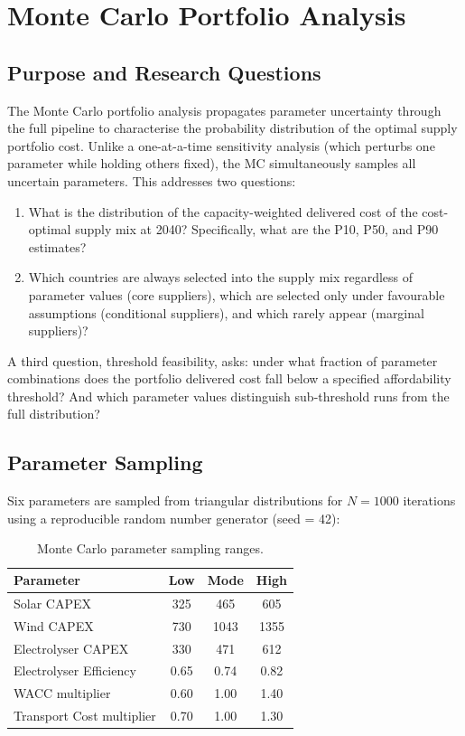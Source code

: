 \section{Monte Carlo Portfolio Analysis}
\label{sec:mc-portfolio}

\subsection{Purpose and Research Questions}

The Monte Carlo portfolio analysis propagates parameter uncertainty through the full pipeline to characterise the probability distribution of the optimal supply portfolio cost. Unlike a one-at-a-time sensitivity analysis (which perturbs one parameter while holding others fixed), the MC simultaneously samples all uncertain parameters. This addresses two questions:

\begin{enumerate}
    \item What is the distribution of the capacity-weighted delivered cost of the cost-optimal supply mix at 2040? Specifically, what are the P10, P50, and P90 estimates?
    \item Which countries are always selected into the supply mix regardless of parameter values (core suppliers), which are selected only under favourable assumptions (conditional suppliers), and which rarely appear (marginal suppliers)?
\end{enumerate}

A third question, threshold feasibility, asks: under what fraction of parameter combinations does the portfolio delivered cost fall below a specified affordability threshold? And which parameter values distinguish sub-threshold runs from the full distribution?

\subsection{Parameter Sampling}

Six parameters are sampled from triangular distributions for $N = 1000$ iterations using a reproducible random number generator (seed = 42):

\begin{table}[htbp]
    \centering
    \caption{Monte Carlo parameter sampling ranges.}
    \label{tab:mc-params}
    \small
    \begin{tabular}{p{5cm}ccc{2cm}}
        \toprule
        Parameter & Low & Mode & High \\
        \midrule
        Solar CAPEX       & 325 & 465 & 605 \\
        Wind CAPEX        & 730 & 1043 & 1355 \\
        Electrolyser CAPEX & 330 & 471 & 612 \\
        Electrolyser Efficiency      & 0.65 & 0.74 & 0.82 \\
        WACC multiplier              & 0.60 & 1.00 & 1.40 \\
        Transport Cost multiplier    & 0.70 & 1.00 & 1.30 \\
        \bottomrule
    \end{tabular}
\end{table}

